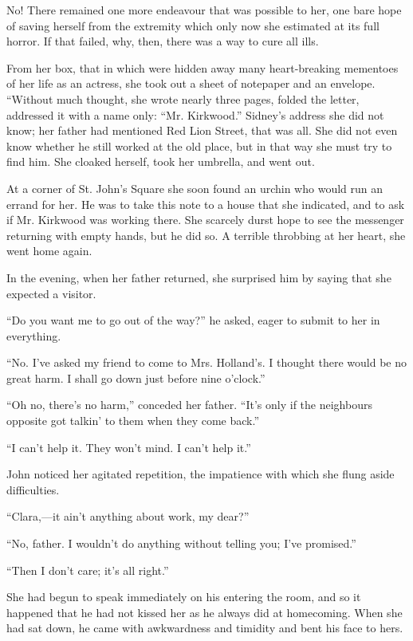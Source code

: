 No! There remained one more endeavour that was possible to her, one bare
hope of saving herself from the extremity which only now she estimated
at its full horror. If that failed, why, then, there was a way to cure
all ills.

From her box, that in which were hidden away many heart-breaking
mementoes of her life as an actress, she took out a sheet of
{\protect\hypertarget{75}{}{}}notepaper and an envelope. ``Without much
thought, she wrote nearly three pages, folded the letter, addressed it
with a name only: ``Mr. Kirkwood.'' Sidney's address she did not know;
her father had mentioned Red Lion Street, that was all. She did not even
know whether he still worked at the old place, but in that way she must
try to find him. She cloaked herself, took her umbrella, and went out.

At a corner of St. John's Square she soon found an urchin who would run
an errand for her. He was to take this note to a house that she
indicated, and to ask if Mr. Kirkwood was working there. She scarcely
durst hope to see the messenger returning with empty hands, but he did
so. A terrible throbbing at her heart, she went home again.

In the evening, when her father returned, she surprised him by saying
that she expected a visitor.

``Do you want me to go out of the way?'' he asked, eager to submit to
her in everything.

``No. I've asked my friend to come to Mrs. Holland's. I thought there
would be no great harm. I shall go down just before nine o'clock.''

``Oh no, there's no harm,'' conceded her
{\protect\hypertarget{76}{}{}}father. ``It's only if the neighbours
opposite got talkin' to them when they come back.''

``I can't help it. They won't mind. I can't help it.''

John noticed her agitated repetition, the impatience with which she
flung aside difficulties.

``Clara,---it ain't anything about work, my dear?''

``No, father. I wouldn't do anything without telling you; I've
promised.''

``Then I don't care; it's all right.''

She had begun to speak immediately on his entering the room, and so it
happened that he had not kissed her as he always did at homecoming. When
she had sat down, he came with awkwardness and timidity and bent his
face to hers.

